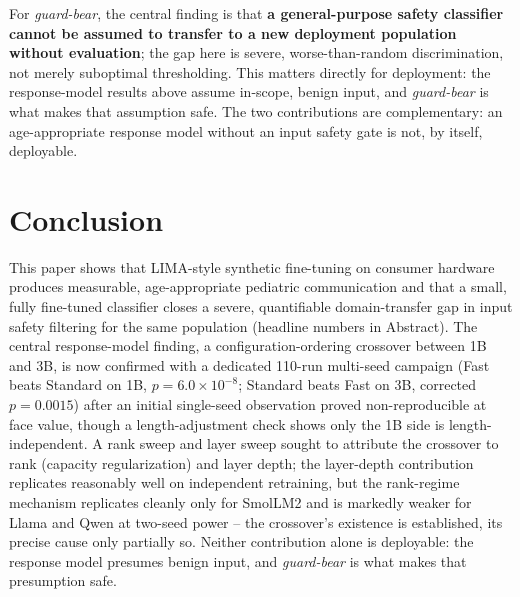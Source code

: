 \documentclass[pdflatex,sn-mathphys-num]{sn-jnl}%
\begin{document}
For \textit{guard-bear}, the central finding is that \textbf{a general-purpose safety classifier cannot be assumed to transfer to a new deployment population without evaluation}; the gap here is severe, worse-than-random discrimination, not merely suboptimal thresholding. This matters directly for deployment: the response-model results above assume in-scope, benign input, and \textit{guard-bear} is what makes that assumption safe. The two contributions are complementary: an age-appropriate response model without an input safety gate is not, by itself, deployable.

\section{Conclusion}\label{sec:conclusion}

This paper shows that LIMA-style synthetic fine-tuning on consumer hardware produces measurable, age-appropriate pediatric communication and that a small, fully fine-tuned classifier closes a severe, quantifiable domain-transfer gap in input safety filtering for the same population (headline numbers in Abstract). The central response-model finding, a configuration-ordering crossover between 1B and 3B, is now confirmed with a dedicated 110-run multi-seed campaign (Fast beats Standard on 1B, $p=6.0\times10^{-8}$; Standard beats Fast on 3B, corrected $p=0.0015$) after an initial single-seed observation proved non-reproducible at face value, though a length-adjustment check shows only the 1B side is length-independent. A rank sweep and layer sweep sought to attribute the crossover to rank (capacity regularization) and layer depth; the layer-depth contribution replicates reasonably well on independent retraining, but the rank-regime mechanism replicates cleanly only for SmolLM2 and is markedly weaker for Llama and Qwen at two-seed power -- the crossover's existence is established, its precise cause only partially so. Neither contribution alone is deployable: the response model presumes benign input, and \textit{guard-bear} is what makes that presumption safe.
\end{document}
